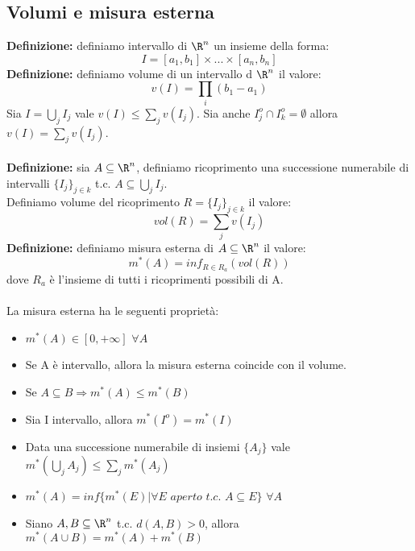 \documentclass{article}
\begin{document}
\subsection{Volumi e misura esterna}
\textbf{Definizione:} definiamo intervallo di $\R^n$ un insieme della forma:
$$ I=[a_1,b_1]\times...\times[a_n,b_n] $$
\textbf{Definizione:} definiamo volume di un intervallo d $\R^n$ il valore:
$$ v(I)=\prod_i(b_1-a_1) $$
Sia $I=\bigcup_jI_j$ vale $v(I)\leq\sum_jv(I_j)$. Sia anche $I_j^o\cap I_k^o=\emptyset$ allora $v(I)=\sum_jv(I_j)$.\\\\
\textbf{Definizione:} sia $A\subseteq\R^n$, definiamo ricoprimento una successione numerabile di intervalli $\{I_j\}_{j\in k}$ t.c. $A\subseteq\bigcup_jI_j$.\\
Definiamo volume del ricoprimento $R=\{I_j\}_{j\in k}$ il valore:
$$ vol(R)=\sum_jv(I_j) $$
\textbf{Definizione:} definiamo misura esterna di $A\subseteq\R^n$ il valore:
$$ m^*(A)=inf_{R\in R_a}(vol(R)) $$
dove $R_a$ è l'insieme di tutti i ricoprimenti possibili di A.\\\\
La misura esterna ha le seguenti proprietà:
\begin{itemize}
    \item $m^*(A)\in[0,+\infty]$ $\forall A$
    \item Se A è intervallo, allora la misura esterna coincide con il volume.
    \item Se $A\subseteq B\Rightarrow m^*(A)\leq m^*(B)$
    \item Sia I intervallo, allora $m^*(I^o)=m^*(I)$
    \item Data una successione numerabile di insiemi $\{A_j\}$ vale $m^*(\bigcup_jA_j)\leq\sum_jm^*(A_j)$
    \item $m^*(A)=inf\{m^*(E)|\forall E\,\,aperto\,\,t.c.\,\,A\subseteq E\}$ $\forall A$
    \item Siano $A,B\subseteq\R^n$ t.c. $d(A,B)>0$, allora $m^*(A\cup B)=m^*(A)+m^*(B)$
\end{itemize}
\end{document}
